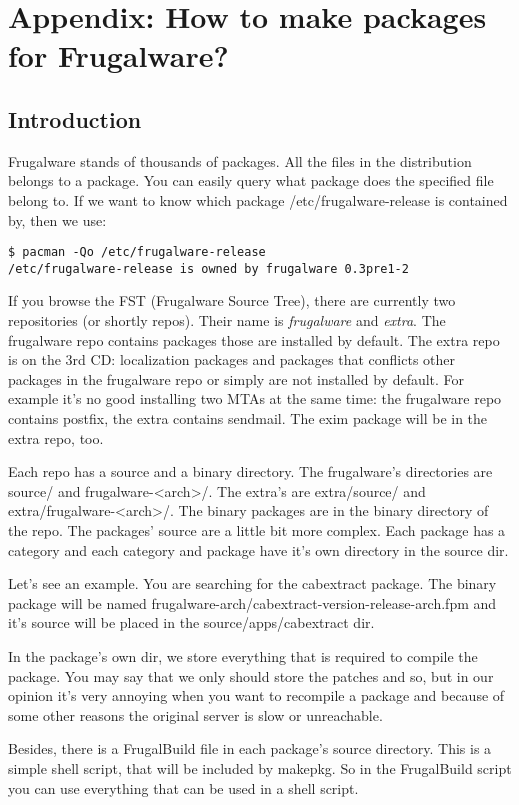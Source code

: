 \chapter{Appendix: How to make packages for Frugalware?}

\section{Introduction}
Frugalware stands of thousands of packages. All the files in the distribution belongs to a package. You can easily query what package does the specified file belong to. If we want to know which package /etc/frugalware-release is contained by, then we use:
\begin{verbatim}
$ pacman -Qo /etc/frugalware-release
/etc/frugalware-release is owned by frugalware 0.3pre1-2
\end{verbatim}
If you browse the FST (Frugalware Source Tree), there are currently two
repositories (or shortly repos). Their name is \textit{frugalware} and
\textit{extra}. The frugalware repo contains packages those are installed by
default. The extra repo is on the 3rd CD: localization packages and packages
that conflicts other packages in the frugalware repo or simply are not
installed by default. For example it's no good installing two MTAs at the same
time: the frugalware repo contains postfix, the extra contains sendmail. The
exim package will be in the extra repo, too.

Each repo has a source and a binary directory. The frugalware's directories are
source/ and frugalware-<arch>/. The extra's are extra/source/ and
extra/frugalware-<arch>/. The binary packages are in the binary directory of
the repo. The packages' source are a little bit more complex. Each package has
a category and each category and package have it's own directory in the source dir.

Let's see an example. You are searching for the cabextract package. The binary
package will be named frugalware-arch/cabextract-version-release-arch.fpm and
it's source will be placed in the source/apps/cabextract dir.

In the package's own dir, we store everything that is required to compile the package. You may say that we only should store the patches and so, but in our opinion it's very annoying when you want to recompile a package and because of some other reasons the original server is slow or unreachable.

Besides, there is a FrugalBuild file in each package's source directory. This is a simple shell script, that will be included by makepkg. So in the FrugalBuild script you can use everything that can be used in a shell script.

